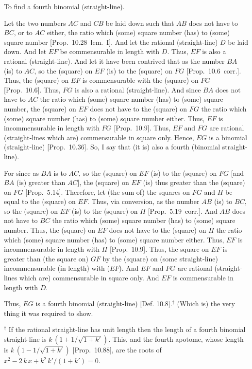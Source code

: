 \begin{Parallel}{}{}
{To find a fourth binomial (straight-line).

\epsfysize=1.2in
\centerline{}

Let the two numbers $AC$ and $CB$ be laid down such that $AB$ does not have to $BC$,  or to $AC$ either, the ratio which (some) square number
(has) to (some) square number [Prop.~10.28~lem.~I].
And let the rational (straight-line) $D$ be laid down. And let $EF$ be
commensurable in length with $D$. Thus, $EF$ is also a rational (straight-line). And let it have been contrived that as the number $BA$ (is) to
$AC$, so the (square) on $EF$ (is) to the (square) on $FG$ [Prop.~10.6~corr.]. Thus, the (square) on $EF$
is commensurable with the (square) on $FG$ [Prop.~10.6]. Thus, $FG$ is also a rational (straight-line). And since $BA$ does not have to $AC$ the ratio which (some)
square number (has) to (some) square number,  the (square) on $EF$
does not have to the (square) on $FG$ the ratio which (some) square number
(has) to (some) square number either. Thus, $EF$ is incommensurable in length with $FG$ [Prop.~10.9]. Thus, $EF$ and
$FG$ are rational (straight-lines which are) commensurable in square only.
Hence, $EG$ is a binomial (straight-line) [Prop.~10.36]. So, I say that (it is) also
a fourth (binomial straight-line).

For since as $BA$ is to $AC$, so the (square) on $EF$ (is) to the (square) on
$FG$ [and $BA$ (is) greater than $AC$], the (square) on $EF$ (is) thus
greater than the (square) on $FG$ [Prop.~5.14]. Therefore, let (the sum of) the squares on
$FG$ and $H$ be equal to the (square) on $EF$. Thus, via conversion,
as the number $AB$ (is) to $BC$, so the (square) on $EF$ (is) to the
(square) on $H$ [Prop.~5.19~corr.]. And $AB$
does not have to $BC$ the ratio which (some) square number (has) to (some)
square number. Thus, the (square) on $EF$ does not have to the
(square) on $H$ the ratio which (some) square number (has) to (some) square
number either. Thus, $EF$ is incommensurable in length with $H$ [Prop.~10.9]. Thus, the square on $EF$ is greater than (the square on) $GF$ by the (square) on (some straight-line)
incommensurable (in length) with ($EF$). And $EF$ and $FG$ are rational (straight-lines which are) commensurable in square only.  And $EF$ is commensurable
in length with $D$.

Thus, $EG$ is a fourth binomial (straight-line) [Def. 10.8].$^\dag$ (Which is) the very thing
it was required to show.}
\end{Parallel}
{\footnotesize\noindent $^\dag$ If the rational straight-line has unit length then the length of a fourth binomial straight-line
is  $k\,(1+1/\sqrt{1+k'})$. This, and the fourth apotome,
whose length is $k\,(1-1/\sqrt{1+k'})$ [Prop.~10.88],
are the roots of $x^2- 2\,k\,x+k^2\,k'/(1+k')=0$.}

